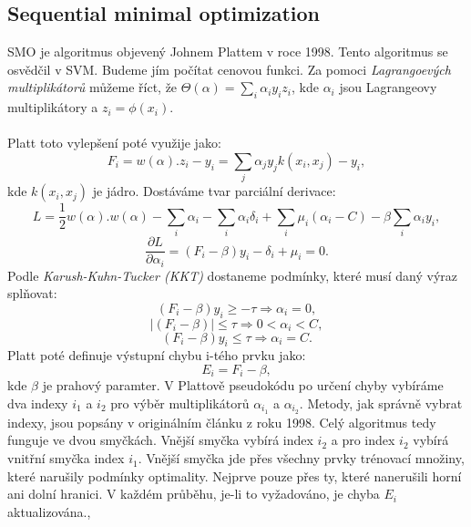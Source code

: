 \documentclass[a4]{article}
\begin{document}
\subsection{Sequential minimal optimization}
SMO je algoritmus objevený Johnem Plattem v roce 1998. Tento algoritmus se osvědčil v SVM. Budeme jím počítat cenovou funkci. Za pomoci \textit{Lagrangoevých multiplikátorů} můžeme říct, že $\Theta(\alpha)=\sum_{i}\alpha_{i}y_{i}z_{i}$, kde $\alpha_i$ jsou Lagrangeovy multiplikátory a $z_{i}=\phi(x_{i})$.
\\\\
Platt toto vylepšení poté využije jako:
$$
F_i =w(\alpha) . z_i - y_i = \sum_{j}\alpha_{j}y_{j}k(x_i,x_j)-y_{i},
$$
kde $k(x_i,x_j)$ je jádro. Dostáváme tvar parciální derivace:
$$
L = \frac{1}{2}w(\alpha).w(\alpha)-\sum_{i}\alpha_{i}-\sum_{i}\alpha_{i}\delta_{i}+\sum_{i}\mu_{i}(\alpha_{i}-C)-\beta\sum_{i}\alpha_{i}y_{i},
$$
$$
\frac{\partial L}{\partial \alpha_{i}}=(F_{i}-\beta)y_{i}-\delta_{i}+\mu_{i}=0.
$$
Podle \textit{Karush-Kuhn-Tucker (KKT)} dostaneme podmínky, které musí daný výraz splňovat:
$$
(F_i-\beta)y_{i} \geq -\tau \Rightarrow \alpha_{i} = 0,
$$
$$
|(F_i-\beta)| \leq \tau \Rightarrow 0 < \alpha_{i} < C,
$$
$$
(F_i-\beta)y_{i} \leq \tau \Rightarrow \alpha_{i} = C.
$$
Platt poté definuje výstupní chybu i-tého prvku jako:
$$
E_{i} = F_{i} - \beta,
$$
kde $\beta$ je prahový paramter. V Plattově pseudokódu po určení chyby vybíráme dva indexy $i_1$ a $i_2$ pro výběr multiplikátorů $\alpha_{i_1}$ a $\alpha_{i_2}$. Metody, jak správně vybrat indexy, jsou popsány v originálním článku z roku 1998. Celý algoritmus tedy funguje ve dvou smyčkách. Vnější smyčka vybírá index $i_2$ a pro index $i_2$ vybírá vnitřní smyčka index $i_1$. Vnější smyčka jde přes všechny prvky trénovací množiny, které narušily podmínky optimality. Nejprve pouze přes ty, které nanerušili horní ani dolní hranici. V každém průběhu, je-li to vyžadováno, je chyba $E_i$ aktualizována.\cite{smo_platt},\cite{andrew}
\end{document}
